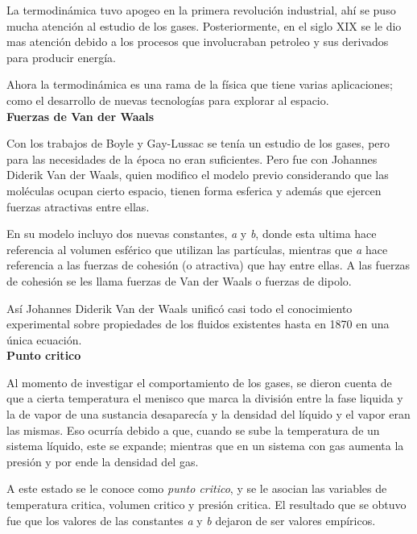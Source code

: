 \documentclass{article}
\begin{document}
\begin{tcolorbox}[breakable]
    La termodinámica tuvo apogeo en la primera revolución industrial, ahí se puso mucha atención al estudio de los gases. Posteriormente, en el siglo XIX se le dio mas atención debido a los procesos que involucraban petroleo y sus derivados para producir energía. \ 
    
    Ahora la termodinámica es una rama de la física que tiene varias aplicaciones; como el desarrollo de nuevas tecnologías para explorar al espacio.\\ 
    
    \textbf{Fuerzas de Van der Waals}\
    
    Con los trabajos de  Boyle y Gay-Lussac se tenía un estudio de los gases, pero para las necesidades de la época no eran suficientes. Pero fue con Johannes Diderik Van der Waals, quien modifico el modelo previo considerando que las moléculas ocupan cierto espacio, tienen forma esferica y además que ejercen fuerzas atractivas entre ellas.\
    
    En su modelo incluyo dos nuevas constantes, \textit{a} y \textit{b}, donde esta ultima hace referencia al volumen esférico que utilizan las partículas, mientras que \textit{a} hace referencia a las fuerzas de cohesión (o atractiva) que hay entre ellas. A las fuerzas de cohesión se les llama fuerzas de Van der Waals o fuerzas de dipolo. \
    
    Así Johannes Diderik Van der Waals unificó casi todo el conocimiento experimental sobre propiedades de los fluidos existentes hasta en 1870 en una única ecuación.\\ 
    
    \textbf{Punto critico}\
    
    Al momento de investigar el comportamiento de los gases, se dieron cuenta de que a cierta temperatura el menisco que marca la división entre la fase liquida y la de vapor de una sustancia desaparecía y la densidad del líquido y el vapor eran las mismas. Eso ocurría debido a que, cuando se sube la temperatura de un sistema líquido, este se expande; mientras que en un sistema con gas aumenta la presión y por ende la densidad del gas. \ 
    
    A este estado se le conoce como \textit{punto critico}, y se le asocian las variables de temperatura critica, volumen critico y presión critica. El resultado que se obtuvo fue que los valores de las constantes \textit{a} y \textit{b} dejaron de ser valores empíricos. \\
    

\end{tcolorbox}
\end{document}
